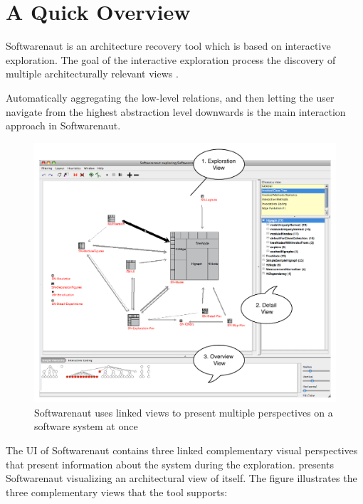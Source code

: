 \documentclass[preprint,12pt]{elsarticle}
\begin{document}
\newpage
\section {A Quick Overview}
\label{sec:over}

Softwarenaut is an architecture recovery tool which is based on interactive exploration. The goal of the interactive exploration process the discovery of multiple architecturally relevant views \cite{lungu-packages}.

Automatically aggregating the low-level relations, and then letting the user navigate from the highest abstraction level downwards is the main interaction approach in Softwarenaut. 

\begin{figure}[h]
\begin{center}
\includegraphics[width=0.9\linewidth]{images/SnautOnSnaut}
\caption{Softwarenaut uses linked views to present multiple perspectives on a software system at once}
\end{center}
\end{figure}

The UI of Softwarenaut contains three linked complementary visual perspectives that present information about the system during the exploration.  presents Softwarenaut visualizing an architectural view of itself. The figure illustrates the three complementary views that the tool supports:
\end{document}
